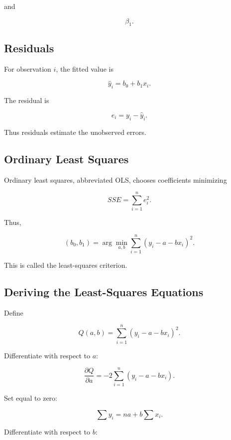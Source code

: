 and

\[
\beta_1.
\]

\subsection{Residuals}
\label{subsec:regression-residuals}

For observation \(i\), the fitted value is

\[
\boxed{
\widehat{y}_i
=
b_0+b_1x_i.
}
\]

The residual is

\[
\boxed{
e_i
=
y_i-\widehat{y}_i.
}
\]

Thus residuals estimate the unobserved errors.

\subsection{Ordinary Least Squares}
\label{subsec:ordinary-least-squares}

Ordinary least squares, abbreviated OLS, chooses coefficients minimizing

\[
\boxed{
SSE
=
\sum_{i=1}^{n}
e_i^2.
}
\]

Thus,

\[
\boxed{
(b_0,b_1)
=
\arg\min_{a,b}
\sum_{i=1}^{n}
(y_i-a-bx_i)^2.
}
\]

This is called the least-squares criterion.

\subsection{Deriving the Least-Squares Equations}
\label{subsec:derive-least-squares}

Define

\[
Q(a,b)
=
\sum_{i=1}^{n}
(y_i-a-bx_i)^2.
\]

Differentiate with respect to \(a\):

\[
\frac{\partial Q}{\partial a}
=
-2
\sum_{i=1}^{n}
(y_i-a-bx_i).
\]

Set equal to zero:

\[
\sum y_i
=
na+b\sum x_i.
\]

Differentiate with respect to \(b\):

